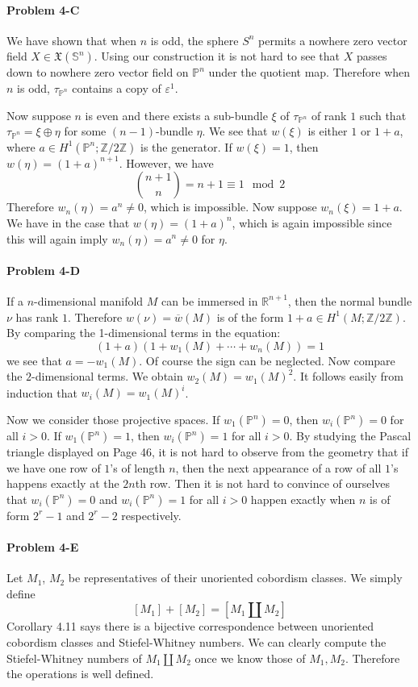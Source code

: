 \documentclass[12pt]{article}
\theoremstyle{plain}
\theoremstyle{definition}
\newcommand{\IP}{\mathbb{P}}
\newcommand{\IR}{\mathbb{R}}
\newcommand{\IS}{\mathbb{S}}
\newcommand{\IZ}{\mathbb{Z}}
\newcommand{\<}{\langle}
\renewcommand{\>}{\rangle}
\newcommand{\sm}{\varepsilon}
\begin{document}
\paragraph{Problem 4-C}
We have shown that when $n$ is odd, the sphere $S^n$ permits a nowhere zero vector field $X \in \mathfrak{X}(\IS^n)$. Using our construction it is not hard to see that $X$ passes down to nowhere zero vector field on $\IP^n$ under the quotient map. Therefore when $n$ is odd, $\tau_{\IP^n}$ contains a copy of $\sm^1$. 

Now suppose $n$ is even and there exists a sub-bundle $\xi$ of $\tau_{\IP^n}$ of rank $1$ such that $\tau_{\IP^n} = \xi \oplus \eta$ for some $(n - 1)$-bundle $\eta$. We see that $w(\xi)$ is either $1$ or $1 + a$, where $a \in H^1(\IP^n; \IZ/2\IZ)$ is the generator. If $w(\xi) = 1$, then $w(\eta) = (1 + a)^{n + 1}$. However, we have 
$$ { n + 1 \choose n } = n + 1 \equiv 1 \mod 2 $$ Therefore $w_n (\eta) = a^n \neq 0$, which is impossible. Now suppose $w_n (\xi) = 1 + a$. We have in the case that $w(\eta) = (1 + a)^n$, which is again impossible since this will again imply $w_n(\eta) = a^n \neq 0$ for $\eta$. 


\paragraph{Problem 4-D} 
If a $n$-dimensional manifold $M$ can be immersed in $\IR^{n + 1}$, then the normal bundle $\nu$ has rank $1$. Therefore $w(\nu) = \overline{w}(M)$ is of the form $1 + a \in H^1(M; \IZ/2\IZ)$. By comparing the 1-dimensional terms in the equation:
$$ (1 + a)( 1 + w_1(M) + \cdots + w_n(M)) = 1$$
we see that $a = - w_1(M)$. Of course the sign can be neglected. Now compare the $2$-dimensional terms. We obtain $w_2(M) = w_1(M)^2$. It follows easily from induction that $w_i(M) = w_1(M)^i$. 

Now we consider those projective spaces. If $w_1(\IP^n) = 0$, then $w_i(\IP^n) = 0$ for all $i > 0$. If $w_1(\IP^n) = 1$, then $w_i(\IP^n) = 1$ for all $i > 0$. By studying the Pascal triangle displayed on Page 46, it is not hard to observe from the geometry that if we have one row of $1$'s of length $n$, then the next appearance of a row of all $1$'s happens exactly at the $2n$th row. Then it is not hard to convince of ourselves that $w_i(\IP^n) = 0$ and $w_i(\IP^n) = 1$ for all $i > 0$ happen exactly when $n$ is of form $2^r - 1$ and $2^r - 2$ respectively.  

\paragraph{Problem 4-E} Let $M_1$, $M_2$ be representatives of their unoriented cobordism classes. We simply define 
$$ [M_1] + [M_2] = [ M_1 \coprod M_2 ]$$
Corollary 4.11 says there is a bijective correspondence between unoriented cobordism classes and Stiefel-Whitney numbers. We can clearly compute the Stiefel-Whitney numbers of $M_1 \coprod M_2$ once we know those of $M_1, M_2$. Therefore the operations is well defined. 
\end{document}
